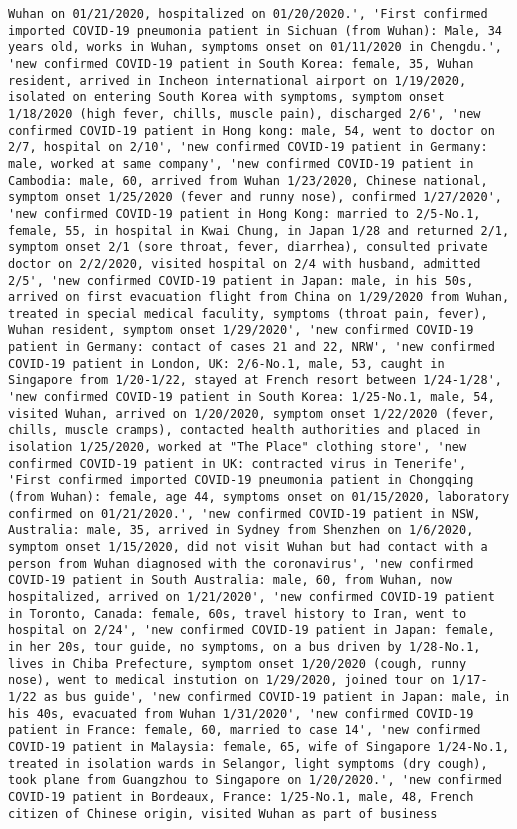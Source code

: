 \documentclass[11pt]{article}
\begin{document}
\begin{Verbatim}[commandchars=\\\{\}]
Wuhan on 01/21/2020, hospitalized on 01/20/2020.', 'First confirmed imported COVID-19 pneumonia patient in Sichuan (from Wuhan): Male, 34 years old, works in Wuhan, symptoms onset on 01/11/2020 in Chengdu.', 'new confirmed COVID-19 patient in South Korea: female, 35, Wuhan resident, arrived in Incheon international airport on 1/19/2020, isolated on entering South Korea with symptoms, symptom onset 1/18/2020 (high fever, chills, muscle pain), discharged 2/6', 'new confirmed COVID-19 patient in Hong kong: male, 54, went to doctor on 2/7, hospital on 2/10', 'new confirmed COVID-19 patient in Germany: male, worked at same company', 'new confirmed COVID-19 patient in Cambodia: male, 60, arrived from Wuhan 1/23/2020, Chinese national, symptom onset 1/25/2020 (fever and runny nose), confirmed 1/27/2020', 'new confirmed COVID-19 patient in Hong Kong: married to 2/5-No.1, female, 55, in hospital in Kwai Chung, in Japan 1/28 and returned 2/1, symptom onset 2/1 (sore throat, fever, diarrhea), consulted private doctor on 2/2/2020, visited hospital on 2/4 with husband, admitted 2/5', 'new confirmed COVID-19 patient in Japan: male, in his 50s, arrived on first evacuation flight from China on 1/29/2020 from Wuhan, treated in special medical faculity, symptoms (throat pain, fever), Wuhan resident, symptom onset 1/29/2020', 'new confirmed COVID-19 patient in Germany: contact of cases 21 and 22, NRW', 'new confirmed COVID-19 patient in London, UK: 2/6-No.1, male, 53, caught in Singapore from 1/20-1/22, stayed at French resort between 1/24-1/28', 'new confirmed COVID-19 patient in South Korea: 1/25-No.1, male, 54, visited Wuhan, arrived on 1/20/2020, symptom onset 1/22/2020 (fever, chills, muscle cramps), contacted health authorities and placed in isolation 1/25/2020, worked at "The Place" clothing store', 'new confirmed COVID-19 patient in UK: contracted virus in Tenerife', 'First confirmed imported COVID-19 pneumonia patient in Chongqing (from Wuhan): female, age 44, symptoms onset on 01/15/2020, laboratory confirmed on 01/21/2020.', 'new confirmed COVID-19 patient in NSW, Australia: male, 35, arrived in Sydney from Shenzhen on 1/6/2020, symptom onset 1/15/2020, did not visit Wuhan but had contact with a person from Wuhan diagnosed with the coronavirus', 'new confirmed COVID-19 patient in South Australia: male, 60, from Wuhan, now hospitalized, arrived on 1/21/2020', 'new confirmed COVID-19 patient in Toronto, Canada: female, 60s, travel history to Iran, went to hospital on 2/24', 'new confirmed COVID-19 patient in Japan: female, in her 20s, tour guide, no symptoms, on a bus driven by 1/28-No.1, lives in Chiba Prefecture, symptom onset 1/20/2020 (cough, runny nose), went to medical instution on 1/29/2020, joined tour on 1/17-1/22 as bus guide', 'new confirmed COVID-19 patient in Japan: male, in his 40s, evacuated from Wuhan 1/31/2020', 'new confirmed COVID-19 patient in France: female, 60, married to case 14', 'new confirmed COVID-19 patient in Malaysia: female, 65, wife of Singapore 1/24-No.1, treated in isolation wards in Selangor, light symptoms (dry cough), took plane from Guangzhou to Singapore on 1/20/2020.', 'new confirmed COVID-19 patient in Bordeaux, France: 1/25-No.1, male, 48, French citizen of Chinese origin, visited Wuhan as part of business 
\end{Verbatim}
\end{document}
